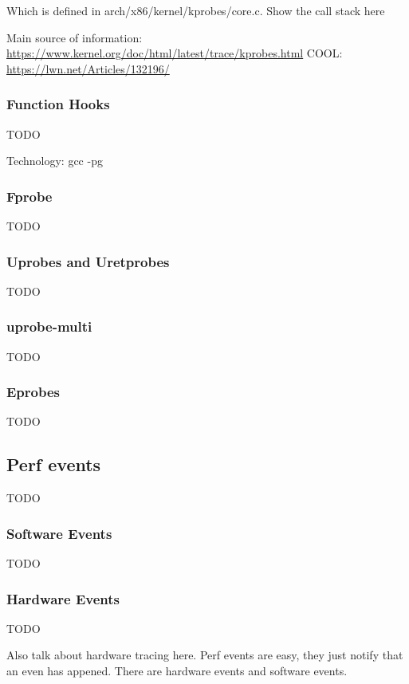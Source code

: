Which is defined in arch/x86/kernel/kprobes/core.c. Show the call
stack here

Main source of information:
\url{https://www.kernel.org/doc/html/latest/trace/kprobes.html}
COOL: \url{https://lwn.net/Articles/132196/}

\subsubsection*{Function Hooks}

TODO

Technology: gcc -pg


\subsubsection*{Fprobe}

TODO

\subsubsection*{Uprobes and Uretprobes}

TODO

\subsubsection*{uprobe-multi}

TODO

\subsubsection*{Eprobes}

TODO

\subsection{Perf events}

TODO

\subsubsection*{Software Events}

TODO

\subsubsection*{Hardware Events}

TODO

Also talk about hardware tracing here. Perf events are easy, they just
notify that an even has appened. There are hardware events and
software events.

